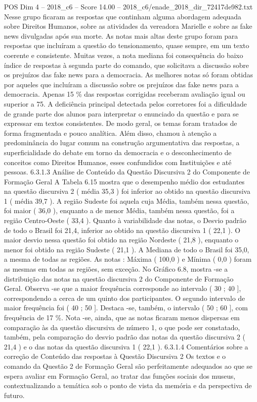 \begin{textsample}{POS Dim 4 – 2018\_c6 – Score 14.00 – 2018\_c6/enade\_2018\_dir\_72417de982.txt}
Nesse grupo ficaram as respostas que continham alguma abordagem adequada sobre Direitos Humanos, sobre as atividades da vereadora Marielle e sobre as fake news divulgadas após sua morte.
As notas mais altas deste grupo foram para respostas que incluíram a questão do tensionamento, quase sempre, em um texto coerente e consistente.
Muitas vezes, a nota mediana foi consequência do baixo índice de respostas à segunda parte do comando, que solicitava a discussão sobre os prejuízos das fake news para a democracia.
As melhores notas só foram obtidas por aqueles que incluíram a discussão sobre os prejuízos das fake news para a democracia.
Apenas 15 \% das respostas corrigidas receberam avaliação igual ou superior a 75.
A deficiência principal detectada pelos corretores foi a dificuldade de grande parte dos alunos para interpretar o enunciado da questão e para se expressar em textos consistentes.
De modo geral, os temas foram tratados de forma fragmentada e pouco analítica.
Além disso, chamou à atenção a predominância do lugar comum na construção argumentativa das respostas, a superficialidade do debate em torno da democracia e o desconhecimento de conceitos como Direitos Humanos, esses confundidos com Instituições e até pessoas. 6.3.1.3 Análise de Conteúdo da Questão Discursiva 2 do Componente de Formação Geral A Tabela 6.15 mostra que o desempenho médio dos estudantes na questão discursiva 2 ( média 35,3 ) foi inferior ao obtido na questão discursiva 1 ( média 39,7 ).
A região Sudeste foi aquela cuja Média, também nessa questão, foi maior ( 36,0 ), enquanto a de menor Média, também nessa questão, foi a região Centro-Oeste ( 33,4 ).
Quanto à variabilidade das notas, o Desvio padrão de todo o Brasil foi 21,4, inferior ao obtido na questão discursiva 1 ( 22,1 ).
O maior desvio nessa questão foi obtido na região Nordeste ( 21,8 ), enquanto o menor foi obtido na região Sudeste ( 21,1 ).
A Mediana de todo o Brasil foi 35,0, a mesma de todas as regiões.
As notas : Máxima ( 100,0 ) e Mínima ( 0,0 ) foram as mesmas em todas as regiões, sem exceção.
No Gráfico 6.8, mostra -se a distribuição das notas na questão discursiva 2 do Componente de Formação Geral.
Observa -se que a maior frequência corresponde ao intervalo ( 30 ; 40 ], correspondendo a cerca de um quinto dos participantes.
O segundo intervalo de maior frequência foi ( 40 ; 50 ].
Destaca -se, também, o intervalo ( 50 ; 60 ], com frequência de 17 \%.
Nota -se, ainda, que as notas ficaram menos dispersas em comparação às da questão discursiva de número 1, o que pode ser constatado, também, pela comparação do desvio padrão das notas da questão discursiva 2 ( 21,4 ) e o das notas da questão discursiva 1 ( 22,1 ). 6.3.1.4 Comentários sobre a correção de Conteúdo das respostas à Questão Discursiva 2 Os textos e o comando da Questão 2 de Formação Geral são perfeitamente adequados ao que se espera avaliar em Formação Geral, ao tratar das funções sociais dos museus, contextualizando a temática sob o ponto de vista da memória e da perspectiva de futuro.

\end{textsample}
